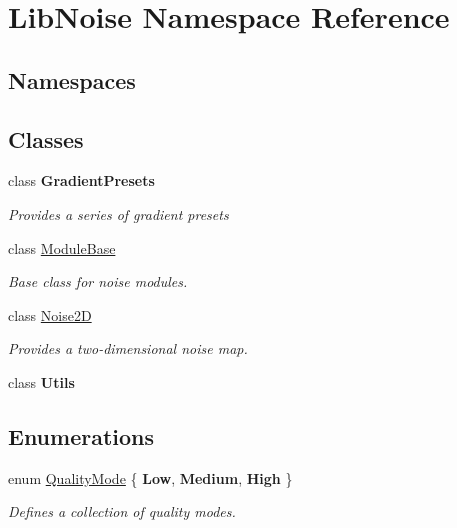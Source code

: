 \hypertarget{namespace_lib_noise}{}\section{Lib\+Noise Namespace Reference}
\label{namespace_lib_noise}
\subsection*{Namespaces}
\begin{DoxyCompactItemize}
\end{DoxyCompactItemize}
\subsection*{Classes}
\begin{DoxyCompactItemize}
\item 
class {\bfseries Gradient\+Presets}
\begin{DoxyCompactList}\small\item\em Provides a series of gradient presets \end{DoxyCompactList}\item 
class \hyperlink{class_lib_noise_1_1_module_base}{Module\+Base}
\begin{DoxyCompactList}\small\item\em Base class for noise modules. \end{DoxyCompactList}\item 
class \hyperlink{class_lib_noise_1_1_noise2_d}{Noise2D}
\begin{DoxyCompactList}\small\item\em Provides a two-\/dimensional noise map. \end{DoxyCompactList}\item 
class {\bfseries Utils}
\end{DoxyCompactItemize}
\subsection*{Enumerations}
\begin{DoxyCompactItemize}
\item 
enum \hyperlink{namespace_lib_noise_ab253d2180e71b8b4b51e250163ca0e27}{Quality\+Mode} \{ {\bfseries Low}, 
{\bfseries Medium}, 
{\bfseries High}
 \}\begin{DoxyCompactList}\small\item\em Defines a collection of quality modes. \end{DoxyCompactList}
\end{DoxyCompactItemize}


